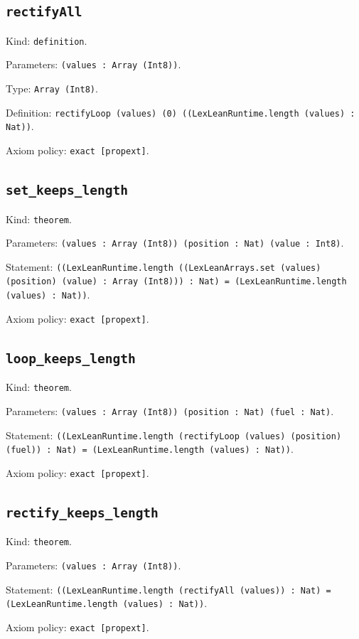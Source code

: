 \documentclass[11pt]{article}
\begin{document}
\subsection*{\texttt{rectifyAll}}
\noindent Kind: \texttt{definition}.\par
\noindent Parameters: \texttt{(values : Array (Int8))}.\par
\noindent Type: \texttt{Array (Int8)}.\par
\noindent Definition: \texttt{rectifyLoop (values) (0) ((LexLeanRuntime.length (values) : Nat))}.\par
\noindent Axiom policy: \texttt{exact [propext]}.\par
\subsection*{\texttt{set\_keeps\_length}}
\noindent Kind: \texttt{theorem}.\par
\noindent Parameters: \texttt{(values : Array (Int8)) (position : Nat) (value : Int8)}.\par
\noindent Statement: \texttt{((LexLeanRuntime.length ((LexLeanArrays.set (values) (position) (value) : Array (Int8))) : Nat) = (LexLeanRuntime.length (values) : Nat))}.\par
\noindent Axiom policy: \texttt{exact [propext]}.\par
\subsection*{\texttt{loop\_keeps\_length}}
\noindent Kind: \texttt{theorem}.\par
\noindent Parameters: \texttt{(values : Array (Int8)) (position : Nat) (fuel : Nat)}.\par
\noindent Statement: \texttt{((LexLeanRuntime.length (rectifyLoop (values) (position) (fuel)) : Nat) = (LexLeanRuntime.length (values) : Nat))}.\par
\noindent Axiom policy: \texttt{exact [propext]}.\par
\subsection*{\texttt{rectify\_keeps\_length}}
\noindent Kind: \texttt{theorem}.\par
\noindent Parameters: \texttt{(values : Array (Int8))}.\par
\noindent Statement: \texttt{((LexLeanRuntime.length (rectifyAll (values)) : Nat) = (LexLeanRuntime.length (values) : Nat))}.\par
\noindent Axiom policy: \texttt{exact [propext]}.\par
\end{document}
